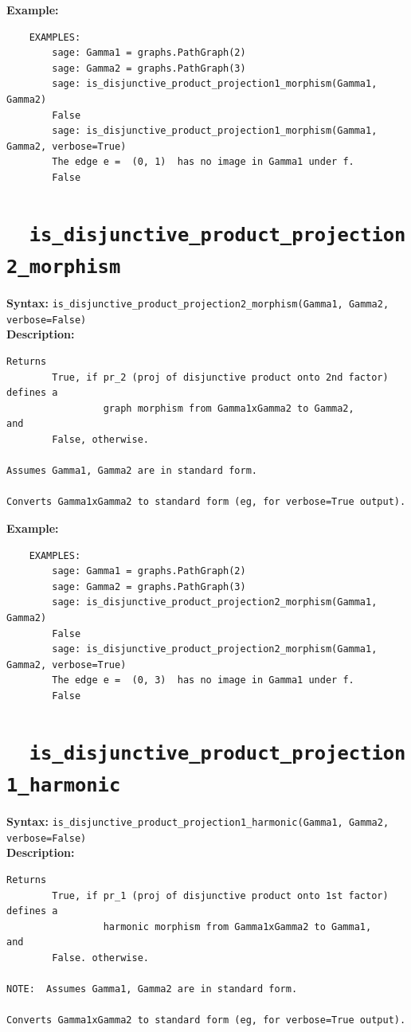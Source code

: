 \documentclass{article}
\begin{document}
\textbf{Example:}
\begin{verbatim}
    EXAMPLES:
        sage: Gamma1 = graphs.PathGraph(2)
        sage: Gamma2 = graphs.PathGraph(3)
        sage: is_disjunctive_product_projection1_morphism(Gamma1, Gamma2) 
        False
        sage: is_disjunctive_product_projection1_morphism(Gamma1, Gamma2, verbose=True) 
        The edge e =  (0, 1)  has no image in Gamma1 under f.
        False
\end{verbatim}

\section{\tt \ \ is\_disjunctive\_product\_projection2\_morphism}

\textbf{Syntax:} \verb}is_disjunctive_product_projection2_morphism(Gamma1, Gamma2, verbose=False)}\\

\textbf{Description:}
\begin{verbatim}
Returns
        True, if pr_2 (proj of disjunctive product onto 2nd factor) defines a 
                 graph morphism from Gamma1xGamma2 to Gamma2,
and
        False, otherwise. 

Assumes Gamma1, Gamma2 are in standard form.

Converts Gamma1xGamma2 to standard form (eg, for verbose=True output).
\end{verbatim}

\textbf{Example:}
\begin{verbatim}
    EXAMPLES:
        sage: Gamma1 = graphs.PathGraph(2)
        sage: Gamma2 = graphs.PathGraph(3)
        sage: is_disjunctive_product_projection2_morphism(Gamma1, Gamma2) 
        False
        sage: is_disjunctive_product_projection2_morphism(Gamma1, Gamma2, verbose=True) 
        The edge e =  (0, 3)  has no image in Gamma1 under f.
        False
\end{verbatim}

\section{\tt \ \ is\_disjunctive\_product\_projection1\_harmonic}

\textbf{Syntax:} \verb}is_disjunctive_product_projection1_harmonic(Gamma1, Gamma2, verbose=False)}\\

\textbf{Description:}
\begin{verbatim}
Returns
        True, if pr_1 (proj of disjunctive product onto 1st factor) defines a 
                 harmonic morphism from Gamma1xGamma2 to Gamma1,
and
        False. otherwise. 

NOTE:  Assumes Gamma1, Gamma2 are in standard form.

Converts Gamma1xGamma2 to standard form (eg, for verbose=True output).
\end{verbatim}
\end{document}
